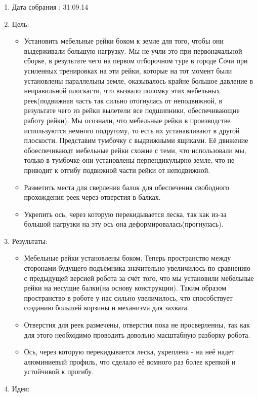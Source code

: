 
  \begin{enumerate}
    \item Дата собрания : 31.09.14
    \item Цель:
    \begin{itemize}
      \item Установить мебельные рейки боком к земле для того, чтобы они выдерживали большую нагрузку. Мы не учли это при первоначальной сборке, в результате чего на первом отборочном туре в городе Сочи при усиленных тренировках на эти рейки, которые на тот момент были установлены параллельны земле, оказывалось крайне большое давление в неправильной плоскасти, что вызвало поломку этих мебельных реек(подвижная часть так сильно отогнулась от неподвижной, в результате чего из рейки вылетели все подшипники, обеспечивающие работу рейки). Мы осознали, что мебельные рейки в производстве используются немного подругому, то есть их устанавливают в другой плоскости. Представим тумбочку с выдвижными ящиками. Её движение обоеспечиваюдт мебельные рейки схожие с теми, что использовали мы, только в тумбочке они установлены перпендикулырно земле, что не приводит к отгибу подвижной части рейки от неподвижной.
      \item Разметить места для сверления балок для обеспечения свободного прохождения реек через отверстия в балках.
      \item Укрепить ось, через которую перекидывается леска, так как из-за большой нагрузки на эту ось она деформировалась(прогнулась).
    \end{itemize}
    \item Результаты:
    \begin{itemize}
      \item Мебельные рейки установлены боком. Теперь пространство между сторонами будущего подъёмника значительно увеличилось по сравнению с предыдущей версией робота за счёт того, что мы установили мебельные рейки на несущие балки(на основу конструкции). Таким образом пространство в роботе у нас сильно увеличилось, что способствует созданию большей корзины и механизма для захвата.
      \item Отверстия для реек размечены, отверстия пока не просверленны, так как для этого необходимо проводить довольно масштабную разборку робота.
      \item Ось, через которую перекидывается леска, укреплена - на неё надет алюминиевый профиль, что сделало её вомного раз более крепкой и устойчивой к прогибу.
    \end{itemize} 
    \item Идеи:

\end{enumerate}
